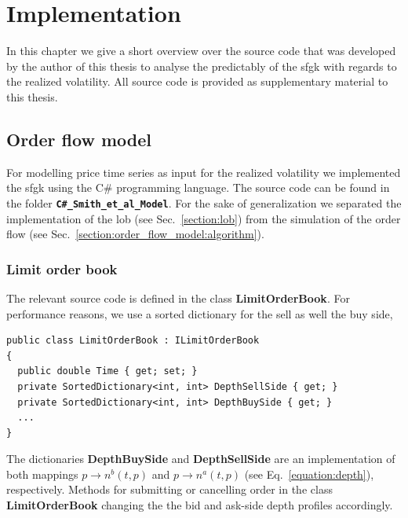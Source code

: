 \documentclass[11pt, a4paper]{thesis}  %
\begin{document}
%
%

\appendix


\chapter{Implementation}
\label{section:implementation}


In this chapter we give a short overview over the source code that was developed by the author of this thesis to analyse the predictably of the \ac{sfgk} with regards to the realized volatility. All source code is provided as supplementary material to this thesis.

\section{Order flow model}
\label{section:implementation:order_flow_model}

For modelling price time series as input for the realized volatility we implemented the \ac{sfgk} using the C\# programming language. The source code can be found in the folder {\bf \texttt{C\#\_Smith\_et\_al\_Model}}.  For the sake of generalization we separated the implementation of the \ac{lob} (see Sec.~\ref{section:lob}) from the simulation of the order flow (see Sec.~\ref{section:order_flow_model:algorithm}). 

\subsection{Limit order book}
The relevant source code is defined in the class {\bf LimitOrderBook}. For performance reasons, we use a sorted dictionary for the sell as well the buy side, 
%
\begin{lstlisting}
public class LimitOrderBook : ILimitOrderBook
{
  public double Time { get; set; }
  private SortedDictionary<int, int> DepthSellSide { get; }
  private SortedDictionary<int, int> DepthBuySide { get; }
  ...
}
\end{lstlisting}
%
The dictionaries {\bf DepthBuySide} and {\bf DepthSellSide} are an implementation of both mappings $p \rightarrow n^b(t, p)$ and $p \rightarrow n^a(t, p)$ (see Eq.~\ref{equation:depth}), respectively. Methods for submitting or cancelling order in the class {\bf LimitOrderBook} changing the the bid and ask-side depth profiles accordingly.
\end{document}
